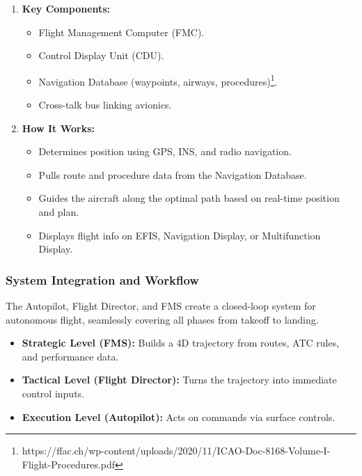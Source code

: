 \documentclass[math,code]{amznotes}
\theoremstyle{remark}
\begin{document}
\begin{enumerate}
    \item \textbf{Key Components:}
    \begin{itemize}
        \item Flight Management Computer (FMC).
        \item Control Display Unit (CDU).
        \item Navigation Database (waypoints, airways, procedures)\footnote{https://ffac.ch/wp-content/uploads/2020/11/ICAO-Doc-8168-Volume-I-Flight-Procedures.pdf}.
        \item Cross-talk bus linking avionics.
    \end{itemize}
    
    \item \textbf{How It Works:}
    \begin{itemize}
        \item Determines position using GPS, INS, and radio navigation.
        \item Pulls route and procedure data from the Navigation Database.
        \item Guides the aircraft along the optimal path based on real-time position and plan.
        \item Displays flight info on EFIS, Navigation Display, or Multifunction Display.
    \end{itemize}
\end{enumerate}

\subsubsection{System Integration and Workflow}
The Autopilot, Flight Director, and FMS create a closed-loop system for autonomous flight, seamlessly covering all phases from takeoff to landing.
\begin{itemize}
    \item \textbf{Strategic Level (FMS):} Builds a 4D trajectory from routes, ATC rules, and performance data.
    \item \textbf{Tactical Level (Flight Director):} Turns the trajectory into immediate control inputs.
    \item \textbf{Execution Level (Autopilot):} Acts on commands via surface controls.
\end{itemize}
\end{document}
